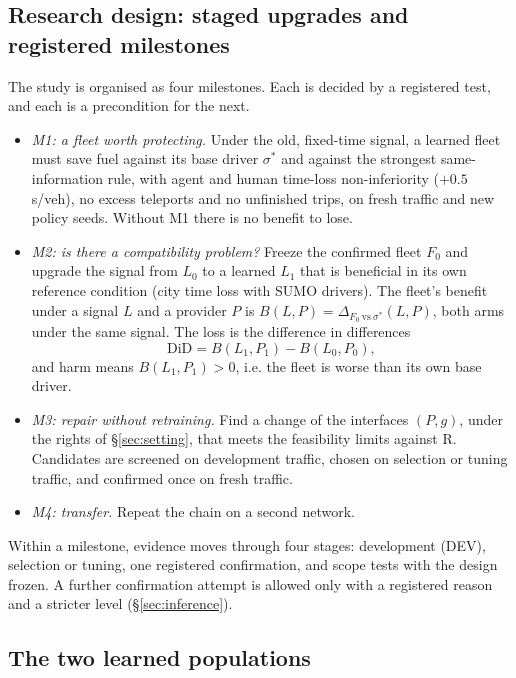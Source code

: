 \documentclass[11pt]{article}
\begin{document}
\subsection{Research design: staged upgrades and registered milestones}\label{sec:design}
The study is organised as four milestones. Each is decided by a registered test, and each is a precondition for the next.
\begin{itemize}\setlength\itemsep{1pt}
\item \emph{M1: a fleet worth protecting.} Under the old, fixed-time signal, a learned fleet must save fuel against its base driver
$\sigma^*$ and against the strongest same-information rule, with agent and human time-loss non-inferiority ($+0.5$\,s/veh), no excess
teleports and no unfinished trips, on fresh traffic and new policy seeds. Without M1 there is no benefit to lose.
\item \emph{M2: is there a compatibility problem?} Freeze the confirmed fleet $F_0$ and upgrade the signal from $L_0$ to a learned $L_1$
that is beneficial in its own reference condition (city time loss with SUMO drivers). The fleet's benefit under a signal $L$ and a provider
$P$ is $B(L,P)=\Delta_{F_0\ \mathrm{vs}\ \sigma^*}(L,P)$, both arms under the same signal. The loss is the difference in differences
\begin{equation}
\mathrm{DiD}=B(L_1,P_1)-B(L_0,P_0),
\end{equation}
and harm means $B(L_1,P_1)>0$, i.e. the fleet is worse than its own base driver.
\item \emph{M3: repair without retraining.} Find a change of the interfaces $(P,g)$, under the rights of §\ref{sec:setting}, that meets the
feasibility limits against R. Candidates are screened on development traffic, chosen on selection or tuning traffic, and confirmed once on
fresh traffic.
\item \emph{M4: transfer.} Repeat the chain on a second network.
\end{itemize}
Within a milestone, evidence moves through four stages: development (DEV), selection or tuning, one registered confirmation, and scope tests
with the design frozen. A further confirmation attempt is allowed only with a registered reason and a stricter level (§\ref{sec:inference}).

\subsection{The two learned populations}\label{sec:populations}
\end{document}
